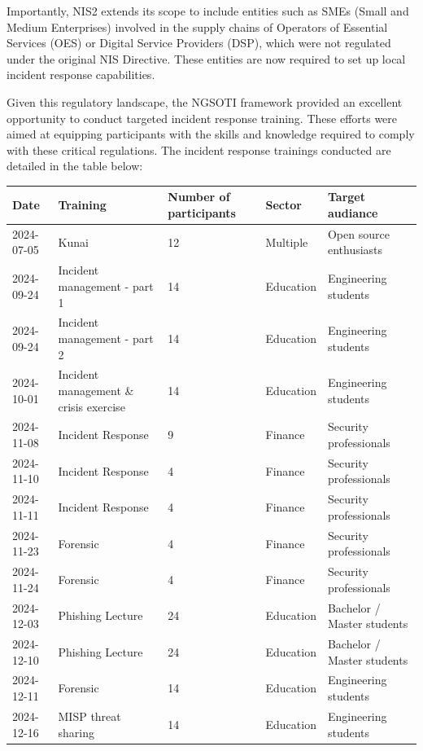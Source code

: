 Importantly, NIS2 extends its scope to include entities such as SMEs (Small and Medium Enterprises) involved in the supply chains of Operators of Essential Services (OES) or Digital Service Providers (DSP), which were not regulated under the original NIS Directive. These entities are now required to set up local incident response capabilities.

Given this regulatory landscape, the NGSOTI framework provided an excellent opportunity to conduct targeted incident response training. These efforts were aimed at equipping participants with the skills and knowledge required to comply with these critical regulations. The incident response trainings conducted are detailed in the table below:


\begin{table}
	\begin{tabular}{llp{2cm}ll}
		\hline
		Date       & Training            & Number of participants & Sector    & Target audiance         \\
		\hline
		2024-07-05 & Kunai               & 12                     & Multiple  & Open source enthusiasts \\
        2024-09-24 & Incident management - part 1  &14            & Education & Engineering students\\
        2024-09-24 & Incident management  - part 2 & 14           & Education & Engineering students \\
        2024-10-01 & Incident management \& crisis  exercise & 14 & Education & Engineering students\\
		2024-11-08 & Incident Response   & 9                      & Finance   & Security professionals  \\
		2024-11-10 & Incident Response   & 4                      & Finance   & Security professionals  \\
		2024-11-11 & Incident Response   & 4                      & Finance   & Security professionals  \\
		2024-11-23 & Forensic            & 4                      & Finance   & Security professionals  \\
		2024-11-24 & Forensic            & 4                      & Finance   & Security professionals  \\
        	2024-12-03 & Phishing Lecture    & 24 			  & Education & Bachelor / Master students  \\
        	2024-12-10 & Phishing Lecture    & 24 			  & Education & Bachelor / Master students  \\
		2024-12-11 & Forensic            & 14                     & Education & Engineering students    \\
		2024-12-16 & MISP threat sharing & 14                     & Education & Engineering students    \\
		\hline
	\end{tabular}
\end{table}

